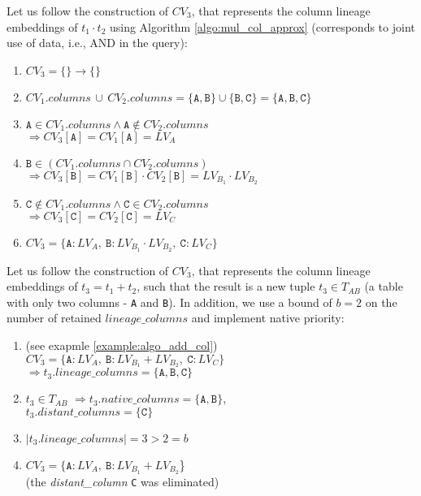 \begin{example-withrun}
    Let us follow the construction of $CV_3$, that represents the column lineage embeddings of $t_1 \cdot t_2$ using Algorithm \ref{algo:mul_col_approx} (corresponds to joint use of data, i.e., AND in the query):
    \begin{enumerate}
        \item $CV_3 = \{\} \rightarrow \{\}$
        \item $CV_1.columns \,\cup\, CV_2.columns = \{\texttt{A}, \texttt{B}\} \cup \{\texttt{B}, \texttt{C}\} = \{\texttt{A}, \texttt{B}, \texttt{C}\}$
        \item $\texttt{A} \in CV_1.columns \wedge \texttt{A} \notin CV_2.columns $\\ $\Rightarrow CV_3[\texttt{A}] = CV_1[\texttt{A}] = LV_A$
        \item $\texttt{B} \in (CV_1.columns \cap CV_2.columns) $\\ $\Rightarrow CV_3[\texttt{B}] = CV_1[\texttt{B}] \cdot CV_2[\texttt{B}] = LV_{B_1} \cdot LV_{B_2}$
        \item $\texttt{C} \notin CV_1.columns \wedge \texttt{C} \in CV_2.columns $\\ $\Rightarrow CV_3[\texttt{C}] = CV_2[\texttt{C}] = LV_C$
        \item $CV_3 = \{\texttt{A}\!: LV_A,\: \texttt{B}\!: LV_{B_1} \cdot LV_{B_2},\: \texttt{C}\!: LV_C\}$
    \end{enumerate}
\end{example-withrun}
\begin{example-withrun}\label{example:generational_priority}
    Let us follow the construction of $CV_3$, that represents the column lineage embeddings of $t_3 = t_1 + t_2$, such that the result is a new tuple $t_3 \in T_{AB}$ (a table with only two columns - \texttt{A} and \texttt{B}). In addition, we use a bound of $b = 2$ on the number of retained $lineage\_columns$ and implement native priority:
    \begin{enumerate}
        \item (see exapmle \ref{example:algo_add_col})\\ $CV_3 = \{\texttt{A}\!: LV_A,\: \texttt{B}\!: LV_{B_1} + LV_{B_2},\: \texttt{C}\!: LV_C\}$\\ $\Rightarrow t_3.lineage\_columns = \{\texttt{A}, \texttt{B}, \texttt{C}\}$
        \item $t_3 \in T_{AB}$ $\Rightarrow t_3.native\_columns = \{\texttt{A}, \texttt{B}\}$, \\$t_3.distant\_columns = \{\texttt{C}\}$
        \item $|t_3.lineage\_columns| = 3 > 2 = b$
        \item $CV_3 = \{\texttt{A}\!: LV_A,\: \texttt{B}\!: LV_{B_1} + LV_{B_2}$\}\\ (the \textit{distant\_column} \texttt{C} was eliminated)
    \end{enumerate}
\end{example-withrun}


